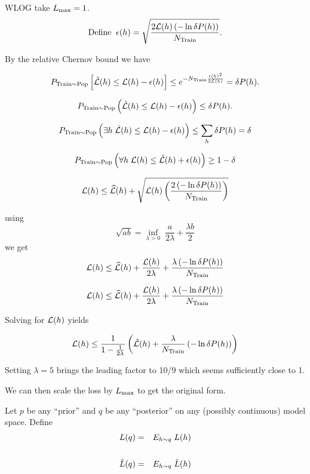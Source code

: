 {

WLOG take $L_{\max} = 1$.
$$\mathrm{Define}\;\;\epsilon(h) = \sqrt{\frac{2{\cal L}(h)\left(-\ln \delta P(h)\right)}{N_\mathrm{Train}}}.$$

\vfill
By the relative Chernov bound we have

\vfill
$$P_{\mathrm{Train} \sim \mathrm{Pop}}\left[\hat{{\cal L}}(h) \leq {\cal L}(h) - \epsilon(h)\right] \leq e^{-N_\mathrm{Train}\frac{\epsilon(h)^2}{2{\cal L}(h)}} = \delta P(h).$$


$$P_{\mathrm{Train} \sim \mathrm{Pop}}\left(\hat{{\cal L}}(h) \leq {\cal L}(h) - \epsilon(h)\right) \leq \delta P(h).$$

\vfill
$$P_{\mathrm{Train} \sim \mathrm{Pop}}\left(\exists h\;\hat{{\cal L}}(h) \leq {\cal L}(h) - \epsilon(h)\right) \leq \sum_h \delta P(h) =\delta$$

\vfill
$$P_{\mathrm{Train} \sim \mathrm{Pop}}\left(\forall h\;{\cal L}(h) \leq \hat{{\cal L}}(h) + \epsilon(h)\right) \geq 1- \delta$$


$${\cal L}(h) \leq \widehat{{\cal L}}(h) + \sqrt{{\cal L}(h)\left(\frac{2 \left(- \ln \delta P(h)\right)}{N_\mathrm{Train}}\right)}$$

using
$$\sqrt{ab} = \inf_{\lambda > 0}\;\frac{a}{2\lambda} + \frac{\lambda b}{2}$$
\vfill
we get
$${\cal L}(h) \leq \widehat{{\cal L}}(h) + \frac{{\cal L}(h)}{2\lambda} + \frac{\lambda\left(- \ln \delta P(h)\right)}{N_\mathrm{Train}}$$

$${\cal L}(h) \leq \widehat{{\cal L}}(h) + \frac{{\cal L}(h)}{2\lambda} + \frac{\lambda\left(-\ln \delta P(h)\right)}{N_\mathrm{Train}}$$

\vfill
Solving for ${\cal L}(h)$ yields

\vfill
$${\cal L}(h) \leq \frac{1}{1-\frac{1}{2\lambda}}\left(\hat{{\cal L}}(h) + \frac{\lambda}{N_\mathrm{Train}}\left(-\ln\delta P(h)\right)\right)$$

\vfill
Setting $\lambda = 5$ brings the leading factor to 10/9 which seems sufficiently close to 1.

\vfill
We can then scale the loss by $L_{\max}$ to get the original form.


Let $p$ be any ``prior'' and $q$ be any ``posterior'' on any  (possibly continuous) model space.
Define
\begin{eqnarray*}
  L(q) & =  &E_{h \sim q}\;L(h) \\
  \\
  \hat{L}(q) & =  &E_{h \sim q}\;\hat{L}(h)
\end{eqnarray*}


}
